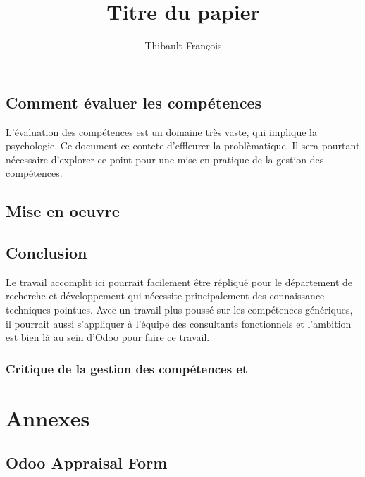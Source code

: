 \documentclass[a4paper,10pt]{report}
\begin{document}
\title  {Titre du papier}
\author  {Thibault François }
\maketitle
\tableofcontents  %

 
 


 
\chapter{Comment évaluer les compétences}
L'évaluation des compétences est un domaine très vaste, qui implique la psychologie. Ce document ce contete d'effleurer la problèmatique. Il sera pourtant nécessaire d'explorer ce point pour une mise en pratique de la gestion des compétences. 
\chapter{Mise en oeuvre}
\chapter{Conclusion}
Le travail accomplit ici pourrait facilement être répliqué pour le département de recherche et développement qui nécessite principalement des connaissance techniques pointues. Avec un travail plus poussé sur les compétences génériques, il pourrait aussi s'appliquer à l'équipe des consultants fonctionnels et l'ambition est bien là au sein d'Odoo pour faire ce travail. 
\section{Critique de la gestion des compétences et }








\label{Bibliographie}
\lhead{\nouppercase{\leftmark}}
 



\part*{Annexes}
\lhead{\nouppercase{\leftmark}}
\appendix %

\chapter{Odoo Appraisal Form}



\end{document}
